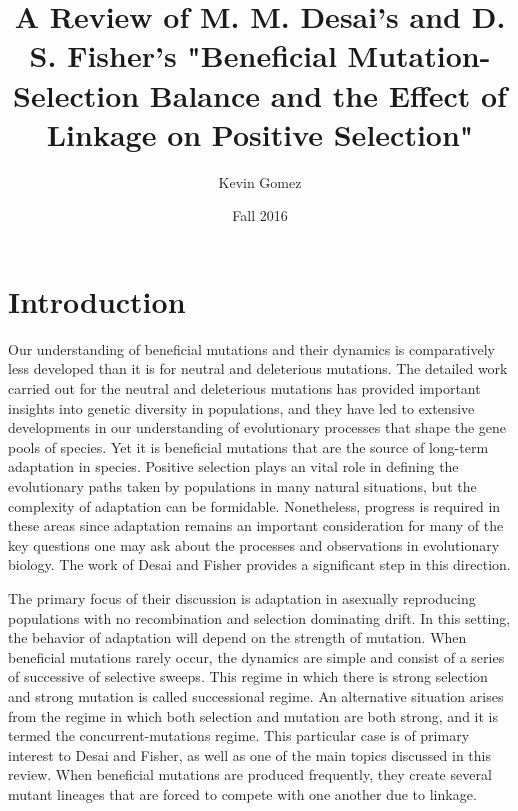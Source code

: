 \documentclass[12pt, one column]{article}
\title{A Review of M. M. Desai's and D. S. Fisher's "Beneficial Mutation-Selection Balance and the Effect of Linkage on Positive Selection"}
\date{Fall 2016}
\author{Kevin Gomez}
\begin{document}
\maketitle
\newpage


\newpage
\section*{Introduction}
Our understanding of beneficial mutations and their dynamics is comparatively less developed than it is for neutral and deleterious mutations.  The detailed work carried out for the neutral and deleterious mutations has provided important insights into genetic diversity in populations, and they have led to extensive developments in our understanding of evolutionary processes that shape the gene pools of species.  Yet it is beneficial mutations that are the source of long-term adaptation in species.  Positive selection plays an vital role in defining the evolutionary paths taken by populations in many natural situations, but the complexity of adaptation can be formidable.  Nonetheless, progress is required in these areas since adaptation remains an important consideration for many of the key questions one may ask about the processes and observations in evolutionary biology.  The work of Desai and Fisher provides a significant step in this direction.

The primary focus of their discussion is adaptation in asexually reproducing populations with no recombination and selection dominating drift.  In this setting, the behavior of adaptation will depend on the strength of mutation.  When beneficial mutations rarely occur, the dynamics are simple and consist of a series of successive of selective sweeps.  This regime in which there is strong selection and strong mutation is called successional regime.  An alternative situation arises from the regime in which both selection and mutation are both strong, and it is termed the concurrent-mutations regime.  This particular case is of primary interest to Desai and Fisher, as well as one of the main topics discussed in this review.  When beneficial mutations are produced frequently, they create several mutant lineages that are forced to compete with one another due to linkage.  
\end{document}
